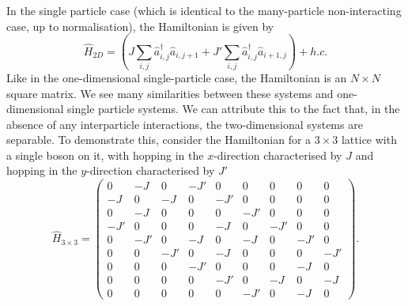 \documentclass[a4paper, 10pt]{article}
\theoremstyle{plain}
\begin{document}
In the single particle case (which is identical to the many-particle
non-interacting case, up to normalisation), the Hamiltonian is given by
\begin{equation}
    \hat{H}_{2D}
    =
    \left (
        J \sum_{i,j}{\hat{a}^{\dagger}_{i,j} \hat{a}_{i,j+1}} +
        J'\sum_{i,j}{\hat{a}^{\dagger}_{i,j}   \hat{a}_{i+1,j}}
    \right )
    +
    h.c.
\end{equation}
Like in the one-dimensional single-particle case, the Hamiltonian is an $N
\times N$ square matrix. We see many similarities between these systems and
one-dimensional single particle systems. We can attribute this to the fact that,
in the absence of any interparticle interactions, the two-dimensional systems
are separable. To demonstrate this, consider the Hamiltonian for a $3 \times 3$
lattice with a single boson on it, with hopping in the $x$-direction
characterised by $J$ and hopping in the $y$-direction characterised by $J'$
\begin{equation}
    \hat{H}_{3\times3}
    =
    \begin{pmatrix}
         0  & -J  &  0  & -J' &  0  &  0  &  0  &  0  &  0  \\
        -J  &  0  & -J  &  0  & -J' &  0  &  0  &  0  &  0  \\
         0  & -J  &  0  &  0  &  0  & -J' &  0  &  0  &  0  \\
        -J' &  0  &  0  &  0  & -J  &  0  & -J' &  0  &  0  \\
         0  & -J' &  0  & -J  &  0  & -J  &  0  & -J' &  0  \\
         0  &  0  & -J' &  0  & -J  &  0  &  0  &  0  & -J' \\
         0  &  0  &  0  & -J' &  0  &  0  &  0  & -J  &  0  \\
         0  &  0  &  0  &  0  & -J' &  0  & -J  &  0  & -J  \\
         0  &  0  &  0  &  0  &  0  & -J' &  0  & -J  &  0
    \end{pmatrix}.
\end{equation}
\end{document}
